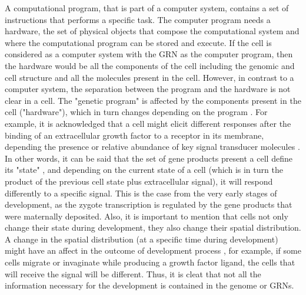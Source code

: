 A computational program, that is part of a computer system, contains a set of instructions that performs a specific task. The computer program needs a hardware, the set of physical objects that compose the computational system and where the computational program can be stored and execute.
If the cell is considered as a computer system with the GRN as the computer program, then the hardware would be all the components of the cell including the genomic and cell structure and all the molecules present in the cell.
However, in contrast to a computer system, the separation between the program and the hardware is not clear in a cell. The "genetic program" is affected by the components present in the cell ("hardware"), which in turn changes depending on the program \citep{susan2000ontogeny,Jaeger2014devmech}.  For example, it is acknowledged that a cell might elicit different responses after the binding of an extracellular growth factor to a receptor in its membrane, depending the presence or relative abundance of key signal transducer molecules \citep{Dailey2005}. In other words, it can be said that the set of gene products present a cell define its "state" \citep{Forgacs_Newman2005}, and depending on the current state of a cell (which is in turn the product of the previous cell state plus extracellular signal), it will respond differently to a specific signal. This is the case from the very early stages of development, as the zygote transcription is regulated by the gene products that were maternally deposited. Also, it is important to mention that cells not only change their state during development, they also change their spatial distribution. A change in the spatial distribution (at a specific time during development) might have an affect in the outcome of development process \citep{Salazar-Ciudad2010}, for example, if some cells migrate or invaginate while producing a growth factor ligand, the cells that will receive the signal will be different. Thus, it is cleat that not all the information necessary for the development is contained in the genome or GRNs.
